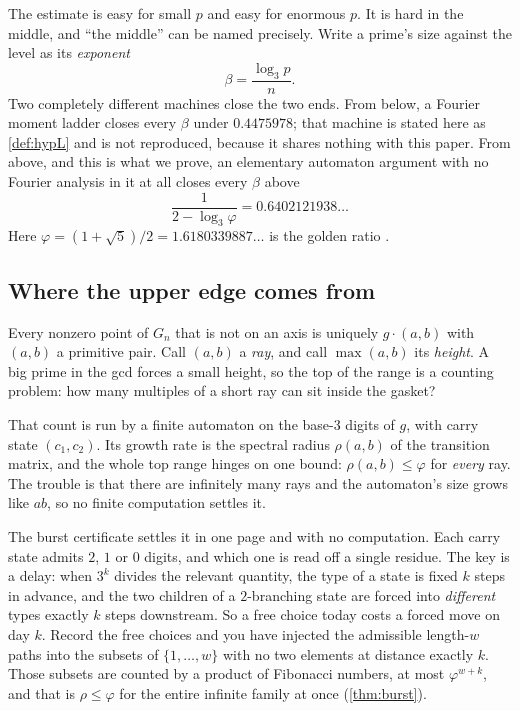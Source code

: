 \documentclass[11pt]{amsart}
\theoremstyle{definition}
\theoremstyle{remark}
\begin{document}
The estimate is easy for small $p$ and easy for enormous $p$. It is hard in the middle, and ``the middle'' can be named precisely. Write a prime's size against the level as its \emph{exponent}
\[
  \beta = \frac{\log_3 p}{n}.
\]
Two completely different machines close the two ends. From below, a Fourier moment ladder closes every $\beta$ under $0.4475978$; that machine is stated here as \cref{def:hypL} and is not reproduced, because it shares nothing with this paper. From above, and this is what we prove, an elementary automaton argument with no Fourier analysis in it at all closes every $\beta$ above
\[
  \frac{1}{2 - \log_3 \varphi} = 0.6402121938 \dots
\]
Here $\varphi = (1+\sqrt5)/2 = 1.6180339887\ldots$ is the golden ratio \cite{oeisphi}.


\subsection*{Where the upper edge comes from}

Every nonzero point of $G_n$ that is not on an axis is uniquely $g \cdot (a,b)$ with $(a,b)$ a primitive pair. Call $(a,b)$ a \emph{ray}, and call $\max(a,b)$ its \emph{height}. A big prime in the gcd forces a small height, so the top of the range is a counting problem: how many multiples of a short ray can sit inside the gasket?

That count is run by a finite automaton on the base-$3$ digits of $g$, with carry state $(c_1,c_2)$. Its growth rate is the spectral radius $\rho(a,b)$ of the transition matrix, and the whole top range hinges on one bound: $\rho(a,b) \le \varphi$ for \emph{every} ray. The trouble is that there are infinitely many rays and the automaton's size grows like $ab$, so no finite computation settles it.

The burst certificate settles it in one page and with no computation. Each carry state admits $2$, $1$ or $0$ digits, and which one is read off a single residue. The key is a delay: when $3^k$ divides the relevant quantity, the type of a state is fixed $k$ steps in advance, and the two children of a $2$-branching state are forced into \emph{different} types exactly $k$ steps downstream. So a free choice today costs a forced move on day $k$. Record the free choices and you have injected the admissible length-$w$ paths into the subsets of $\{1,\dots,w\}$ with no two elements at distance exactly $k$. Those subsets are counted by a product of Fibonacci numbers, at most $\varphi^{w+k}$, and that is $\rho \le \varphi$ for the entire infinite family at once (\cref{thm:burst}).
\end{document}
